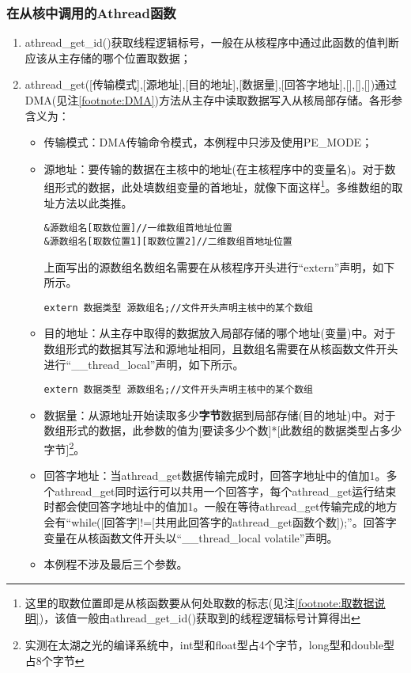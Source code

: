 \subsubsection{在从核中调用的Athread函数}
\begin{enumerate}
	\item athread\_get\_id()获取线程逻辑标号，一般在从核程序中通过此函数的值判断应该从主存储的哪个位置取数据；
	\item athread\_get([传输模式],[源地址],[目的地址],[数据量],[回答字地址],[],[],[])通过DMA(见注\ref{footnote:DMA})方法从主存中读取数据写入从核局部存储。各形参含义为：
	\begin{itemize}
		\item 传输模式：DMA传输命令模式，本例程中只涉及使用PE\_MODE；
        \item 源地址：要传输的数据在主核中的地址(在主核程序中的变量名)。对于数组形式的数据，此处填数组变量的首地址，就像下面这样\footnote{这里的取数位置即是从核函数要从何处取数的标志(见注\ref{footnote:取数据说明})，该值一般由athread\_get\_id()获取到的线程逻辑标号计算得出}。多维数组的取址方法以此类推。
		\begin{lstlisting}
&源数组名[取数位置]//一维数组首地址位置
&源数组名[取数位置1][取数位置2]//二维数组首地址位置
        \end{lstlisting}
        上面写出的源数组名数组名需要在从核程序开头进行“extern”声明，如下所示。
		\begin{lstlisting}
extern 数据类型 源数组名;//文件开头声明主核中的某个数组
		\end{lstlisting}
		\item 目的地址：从主存中取得的数据放入局部存储的哪个地址(变量)中。对于数组形式的数据其写法和源地址相同，且数组名需要在从核函数文件开头进行“\_\_thread\_local”声明，如下所示。
		\begin{lstlisting}
extern 数据类型 源数组名;//文件开头声明主核中的某个数组
		\end{lstlisting}
		\item 数据量：从源地址开始读取多少\textbf{字节}数据到局部存储(目的地址)中。对于数组形式的数据，此参数的值为[要读多少个数]*[此数组的数据类型占多少字节]\footnote{实测在太湖之光的编译系统中，int型和float型占4个字节，long型和double型占8个字节}。
		\item 回答字地址：当athread\_get数据传输完成时，回答字地址中的值加1。多个athread\_get同时运行可以共用一个回答字，每个athread\_get运行结束时都会使回答字地址中的值加1。一般在等待athread\_get传输完成的地方会有“while([回答字]!=[共用此回答字的athread\_get函数个数]);”。回答字变量在从核函数文件开头以“\_\_thread\_local volatile”声明。
		\item 本例程不涉及最后三个参数。
	\end{itemize}
\end{enumerate}



